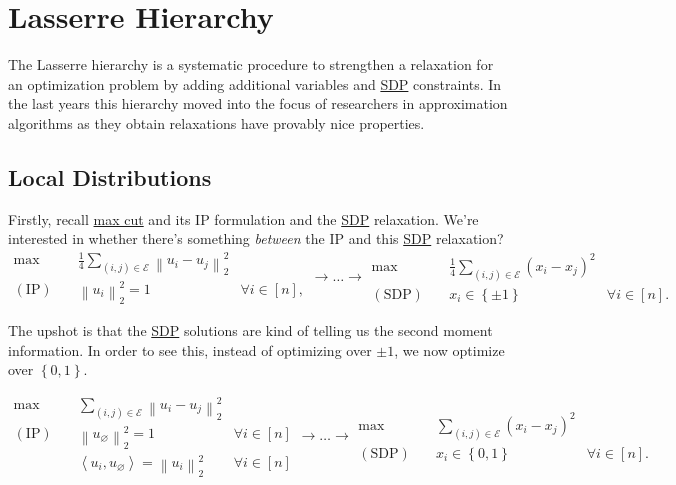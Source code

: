 \section{Lasserre Hierarchy}
The Lasserre hierarchy is a systematic procedure to strengthen a relaxation for an optimization problem by adding additional variables and \hyperref[def:SDP]{SDP} constraints. In the last years this hierarchy moved into the focus of researchers in approximation algorithms as they obtain relaxations have provably nice properties.

\subsection{Local Distributions}
Firstly, recall \hyperref[prb:max-cut]{max cut} and its IP formulation and the \hyperref[def:SDP]{SDP} relaxation. We're interested in whether there's something \emph{between} the IP and this \hyperref[def:SDP]{SDP} relaxation?
\[
	\begin{aligned}
		\max~            & \frac{1}{4} \sum_{(i, j)\in \mathcal{E} } \left\lVert u_i - u_j\right\rVert _2^2                     \\
		(\text{IP})\quad & \left\lVert u_i\right\rVert _2^2 = 1                                             & \forall i\in [n],
	\end{aligned} \to \dots \to \begin{aligned}
		\max~             & \frac{1}{4} \sum_{(i, j)\in \mathcal{E} }  (x_i - x_j)^{2}                     \\
		(\text{SDP})\quad & x_i \in \left\{ \pm 1 \right\}                             & \forall i\in [n].
	\end{aligned}
\]

The upshot is that the \hyperref[def:SDP]{SDP} solutions are kind of telling us the second moment information. In order to see this, instead of optimizing over \(\pm 1\), we now optimize over \(\left\{ 0, 1 \right\} \).

\[
	\begin{aligned}
		\max~            & \sum_{(i, j)\in \mathcal{E} } \left\lVert u_i - u_j\right\rVert _2^2                                   \\
		(\text{IP})\quad & \left\lVert u_{\varnothing}\right\rVert _2^2 = 1                                    & \forall i\in [n] \\
		                 & \left\langle u_i, u_{\varnothing } \right\rangle = \left\lVert u_i\right\rVert _2^2 & \forall i\in [n]
	\end{aligned} \to \dots \to \begin{aligned}
		\max~             & \sum_{(i, j)\in \mathcal{E} }  (x_i - x_j)^{2}                     \\
		(\text{SDP})\quad & x_i \in \left\{ 0, 1 \right\}                  & \forall i\in [n].
	\end{aligned}
\]

